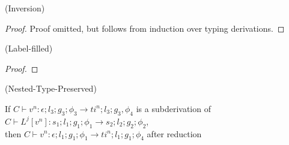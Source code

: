 \begin{lemma}{(Inversion)}
\end{lemma}
\begin{proof}
    Proof omitted, but follows from induction over typing derivations.
\end{proof}

\begin{lemma}{(Label-filled)}
\end{lemma}
\begin{proof}
\end{proof}

\begin{lemma}{(Nested-Type-Preserved)}

    If $C \vdash v^n : \epsilon;l_3;g_3;\phi_3 \rightarrow ti^n;l_3;g_3,\phi_4$ is a subderivation of $C \vdash  L^j [v^n] : s_1;l_1;g_1;\phi_1 \rightarrow s_2;l_2;g_2;\phi_2$,
    \\then $C \vdash v^n : \epsilon;l_1;g_1;\phi_1 \rightarrow ti^n;l_1;g_1;\phi_4$ after reduction
\end{lemma}
